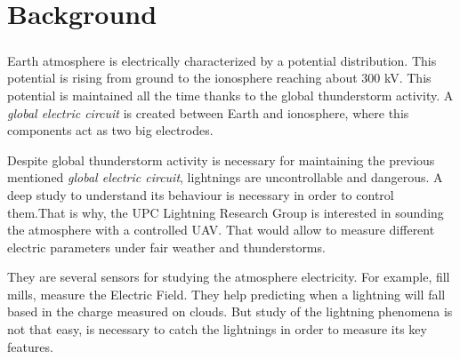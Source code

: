 \chapter{Background}
\paragraph{} Earth atmosphere is electrically characterized by a potential distribution. This potential is rising from ground to the ionosphere
reaching about 300 kV. This potential is maintained all the time thanks to the global thunderstorm activity. A \textit{global electric circuit} is created between Earth and ionosphere, where this components act as two big electrodes. \cite{llampsMontanya}

 \noindent Despite global thunderstorm activity is necessary for maintaining the previous mentioned \textit{global electric circuit}, lightnings are uncontrollable and dangerous. A deep study to understand its behaviour is necessary in order to control them.That is why, the UPC Lightning Research Group is interested in sounding the atmosphere with a controlled UAV. That would allow to measure different electric parameters under fair weather and thunderstorms.
 
 \noindent They are several sensors for studying the atmosphere electricity. For example, fill mills, measure the Electric Field. They help predicting when a lightning will fall based in the charge measured on clouds. But study of the lightning phenomena is not that easy, is necessary to catch the lightnings in order to measure its key features.
 
